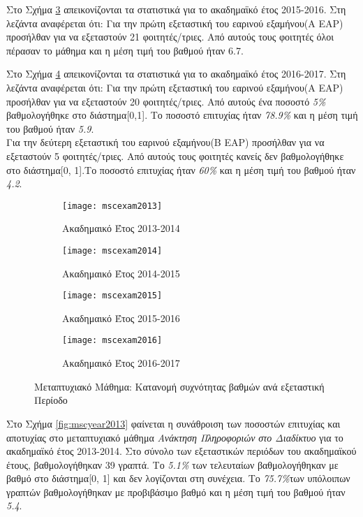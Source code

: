 \documentclass[12pt,a4paper,final]{article}
\begin{document}
Στο Σχήμα \ref{fig:mscexam2015} απεικονίζονται τα στατιστικά  για το ακαδημαϊκό έτος 2015-2016. Στη λεζάντα  αναφέρεται ότι: Για την πρώτη εξεταστική του εαρινού εξαμήνου(Α ΕΑΡ) προσήλθαν  για να εξεταστούν 21 φοιτητές/τριες.
Από αυτούς τους φοιτητές όλοι πέρασαν το μάθημα και η μέση τιμή του βαθμού ήταν 6.7. \medskip

Στο Σχήμα \ref{fig:mscexam2016} απεικονίζονται τα στατιστικά  για το ακαδημαϊκό έτος 2016-2017. Στη λεζάντα  αναφέρεται ότι: Για την πρώτη εξεταστική του εαρινού εξαμήνου(Α ΕΑΡ) προσήλθαν  για να εξεταστούν 20 φοιτητές/τριες.
Από αυτούς ένα ποσοστό \textit{5\%} βαθμολογήθηκε στο διάστημα[0,1].
Το ποσοστό επιτυχίας ήταν \textit{78.9\%} και η μέση τιμή του βαθμού ήταν \textit{5.9}.\\
Για την δεύτερη  εξεταστική του εαρινού εξαμήνου(Β ΕΑΡ) προσήλθαν για να εξεταστούν 5
φοιτητές/τριες. Από αυτούς τους φοιτητές κανείς δεν βαθμολογήθηκε στο διάστημα[0, 1].Το ποσοστό επιτυχίας ήταν \textit{60\%} και η μέση τιμή του βαθμού ήταν \textit{4.2}.

\graphicspath{{./figures/msc/}}
\begin{figure}[h]
	\centering
	\begin{subfigure}[b]{0.475\textwidth}
		\centering 
		\texttt{[image: mscexam2013]}
		\caption{Ακαδημαικό Έτος 2013-2014}
		\label{fig:mscexam2013}
	\end{subfigure}
	\hfill
	\begin{subfigure}[b]{0.475\textwidth}
		\centering 
		\texttt{[image: mscexam2014]}
		\caption{Ακαδημαικό Έτος 2014-2015}
		\label{fig:mscexam2014}
	\end{subfigure}
	
	\begin{subfigure}[b]{0.475\textwidth}
		\centering 
		\texttt{[image: mscexam2015]}
		\caption{Ακαδημαικό Έτος 2015-2016}
		\label{fig:mscexam2015}
	\end{subfigure}
	\hfill
	\begin{subfigure}[b]{0.475\textwidth}
		\centering 
		\texttt{[image: mscexam2016]}
		\caption{Ακαδημαικό Έτος 2016-2017}
		\label{fig:mscexam2016}
	\end{subfigure}
	\caption{Μεταπτυχιακό Μάθημα: Κατανομή συχνότητας βαθμών ανά εξεταστική Περίοδο}	
	\label{fig:mscdensExam}
\end{figure}

\clearpage
Στο Σχήμα \ref{fig:mscyear2013} φαίνεται η συνάθροιση  των ποσοστών επιτυχίας και αποτυχίας στο μεταπτυχιακό μάθημα \textit{Ανάκτηση Πληροφοριών στο Διαδίκτυο} για το ακαδημαϊκό έτος  2013-2014.
Στο σύνολο των εξεταστικών περιόδων του ακαδημαϊκού έτους, βαθμολογήθηκαν 39 γραπτά. Το \textit{5.1\%} των τελευταίων βαθμολογήθηκαν με βαθμό στο διάστημα[0, 1] και δεν λογίζονται στη συνέχεια. Το \textit{75.7\%}των υπόλοιπων γραπτών βαθμολογήθηκαν με προβιβάσιμο βαθμό και η μέση τιμή του βαθμού ήταν \textit{5.4}.\medskip
\end{document}
